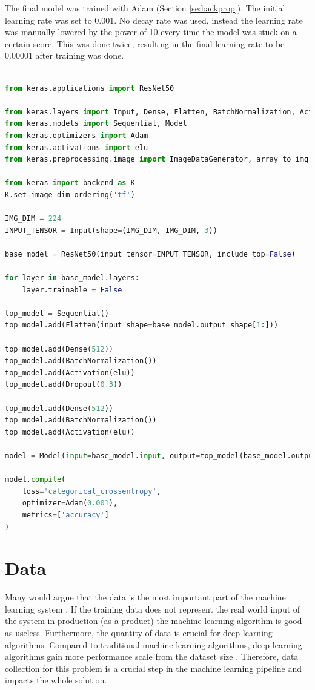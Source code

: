 \documentclass[times, utf8, diplomski]{fer}
\begin{document}
The final model was trained with Adam \citep{kingma_adam:_2014} (Section \ref{se:backprop}). The initial learning rate was set to 0.001. No decay rate was used, instead the learning rate was manually lowered by the power of 10 every time the model was stuck on a certain score. This was done twice, resulting in the final learning rate to be 0.00001 after training was done.

\begin{lstlisting}[language=Python, caption=The model that was appended to the end of ResNet-50]

from keras.applications import ResNet50

from keras.layers import Input, Dense, Flatten, BatchNormalization, Activation, Dropout
from keras.models import Sequential, Model
from keras.optimizers import Adam
from keras.activations import elu
from keras.preprocessing.image import ImageDataGenerator, array_to_img, img_to_array, load_img

from keras import backend as K
K.set_image_dim_ordering('tf')

IMG_DIM = 224
INPUT_TENSOR = Input(shape=(IMG_DIM, IMG_DIM, 3))

base_model = ResNet50(input_tensor=INPUT_TENSOR, include_top=False)

for layer in base_model.layers:
    layer.trainable = False

top_model = Sequential()
top_model.add(Flatten(input_shape=base_model.output_shape[1:]))

top_model.add(Dense(512))
top_model.add(BatchNormalization())
top_model.add(Activation(elu))
top_model.add(Dropout(0.3))

top_model.add(Dense(512))
top_model.add(BatchNormalization())
top_model.add(Activation(elu))

model = Model(input=base_model.input, output=top_model(base_model.output))

model.compile(
	loss='categorical_crossentropy',
    optimizer=Adam(0.001),
    metrics=['accuracy']
)

\end{lstlisting}


\chapter{Data}

Many would argue that the data is the most important part of the machine learning system \citep{deep_learning}. If the training data does not represent the real world input of the system in production (as a product) the machine learning algorithm is good as useless. Furthermore, the quantity of data is crucial for deep learning algorithms. Compared to traditional machine learning algorithms, deep learning algorithms gain more performance scale from the dataset size \citep{deep_learning}. Therefore, data collection for this problem is a crucial step in the machine learning pipeline and impacts the whole solution.
\end{document}
